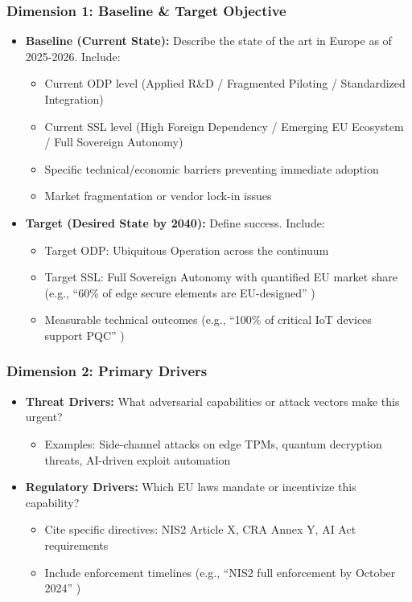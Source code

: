 \documentclass[12pt,a4paper]{article}
\begin{document}
\subsubsection*{Dimension 1: Baseline \& Target Objective}
\begin{itemize}
    \item \textbf{Baseline (Current State):} Describe the state of the art in Europe as of 2025-2026. Include:
    \begin{itemize}
        \item Current ODP level (Applied R\&D / Fragmented Piloting / Standardized Integration)
        \item Current SSL level (High Foreign Dependency / Emerging EU Ecosystem / Full Sovereign Autonomy)
        \item Specific technical/economic barriers preventing immediate adoption
        \item Market fragmentation or vendor lock-in issues
    \end{itemize}
    \item \textbf{Target (Desired State by 2040):} Define success. Include:
    \begin{itemize}
        \item Target ODP: Ubiquitous Operation across the continuum
        \item Target SSL: Full Sovereign Autonomy with quantified EU market share (e.g., ``60\% of edge secure elements are EU-designed'' )
        \item Measurable technical outcomes (e.g., ``100\% of critical IoT devices support PQC'' )
    \end{itemize}
\end{itemize}

\subsubsection*{Dimension 2: Primary Drivers}
\begin{itemize}
    \item \textbf{Threat Drivers:} What adversarial capabilities or attack vectors make this urgent?
    \begin{itemize}
        \item Examples: Side-channel attacks on edge TPMs, quantum decryption threats, AI-driven exploit automation
    \end{itemize}
    \item \textbf{Regulatory Drivers:} Which EU laws mandate or incentivize this capability?
    \begin{itemize}
        \item Cite specific directives: NIS2 Article X, CRA Annex Y, AI Act requirements
        \item Include enforcement timelines (e.g., ``NIS2 full enforcement by October 2024'' )
    \end{itemize}
\end{itemize}
\end{document}
